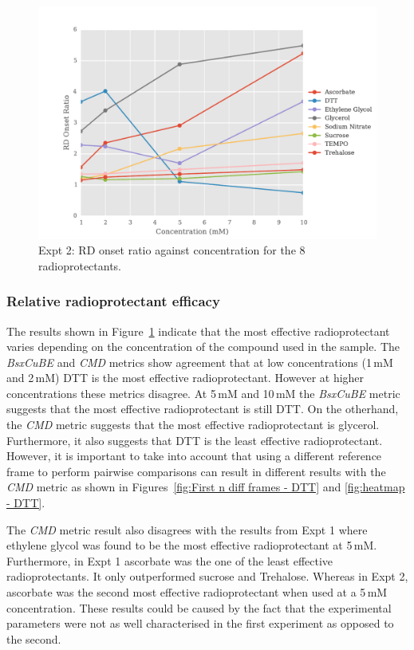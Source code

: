 \begin{figure}
    \centering
    \includegraphics[width=1.0\textwidth]{figures/saxs/RatioPlots.pdf}
    \caption[RD onset ratio against concentration for the 8 radioprotectants]{Expt 2: RD onset ratio against concentration for the 8 radioprotectants.}
    \label{fig:SAXS Ratio plot}
\end{figure}

\subsubsection{Relative radioprotectant efficacy}
\label{subs:Relative radioprotectant efficacy}
The results shown in Figure~\ref{fig:SAXS Ratio plot} indicate that the most effective radioprotectant varies depending on the concentration of the compound used in the sample.
The \textit{BsxCuBE} and \textit{CMD} metrics show agreement that at low concentrations (1$\,$mM and 2$\,$mM) DTT is the most effective radioprotectant.
However at higher concentrations these metrics disagree.
At 5$\,$mM and 10$\,$mM the \textit{BsxCuBE} metric suggests that the most effective radioprotectant is still DTT.
On the otherhand, the \textit{CMD} metric suggests that the most effective radioprotectant is glycerol.
Furthermore, it also suggests that DTT is the least effective radioprotectant.
However, it is important to take into account that using a different reference frame to perform pairwise comparisons can result in different results with the \textit{CMD} metric as shown in Figures~\ref{fig:First n diff frames - DTT} and \ref{fig:heatmap - DTT}.

The \textit{CMD} metric result also disagrees with the results from Expt 1 where ethylene glycol was found to be the most effective radioprotectant at 5$\,$mM.
Furthermore, in Expt 1 ascorbate was the one of the least effective radioprotectants.
It only outperformed sucrose and Trehalose.
Whereas in Expt 2, ascorbate was the second most effective radioprotectant when used at a 5$\,$mM concentration.
These results could be caused by the fact that the experimental parameters were not as well characterised in the first experiment as opposed to the second.

